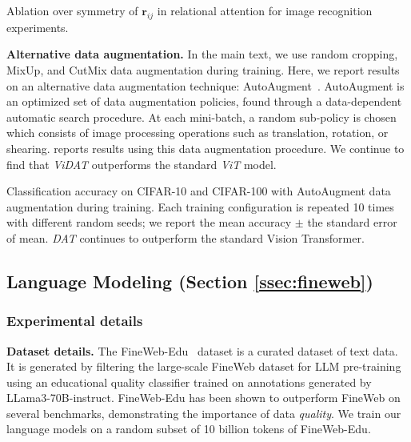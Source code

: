 \begin{table}
    \resizebox{\textwidth}{!}{
    
    }
    \caption{Ablation over symmetry of $\bm{r}_{ij}$ in relational attention for image recognition experiments.}\label{tab:cifar_results_symmetry_ablation}
\end{table}

\textbf{Alternative data augmentation.} In the main text, we use random cropping, MixUp, and CutMix data augmentation during training. Here, we report results on an alternative data augmentation technique: AutoAugment~\citep{cubuk2019autoaugmentlearningaugmentationpolicies}. AutoAugment is an optimized set of data augmentation policies, found through a data-dependent automatic search procedure. At each mini-batch, a random sub-policy is chosen which consists of image processing operations such as translation, rotation, or shearing.  reports results using this data augmentation procedure. We continue to find that \textit{ViDAT} outperforms the standard \textit{ViT} model.

\begin{table}
    
    \caption{Classification accuracy on CIFAR-10 and CIFAR-100 with AutoAugment data augmentation during training. Each training configuration is repeated 10 times with different random seeds; we report the mean accuracy $\pm$ the standard error of mean. \textit{DAT} continues to outperform the standard Vision Transformer.}\label{tab:cifar_results_autoaugment}
\end{table}

\subsection{Language Modeling (Section \ref{ssec:fineweb})}\label{ssec:appendix_fineweb}

\subsubsection*{Experimental details}

\textbf{Dataset details.} The FineWeb-Edu~\citep{lozhkov2024fineweb-edu} dataset is a curated dataset of text data. It is generated by filtering the large-scale FineWeb dataset for LLM pre-training~\citep{penedo2024finewebdatasetsdecantingweb} using an educational quality classifier trained on annotations generated by LLama3-70B-instruct. FineWeb-Edu has been shown to outperform FineWeb on several benchmarks, demonstrating the importance of data \textit{quality}. We train our language models on a random subset of 10 billion tokens of FineWeb-Edu.

